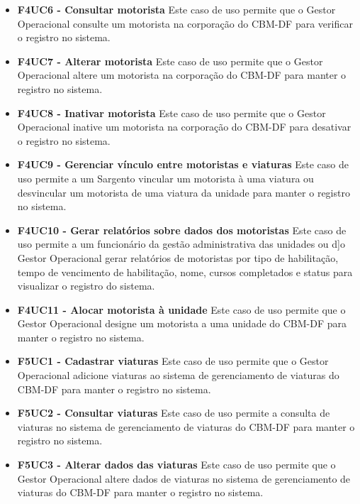 \begin{itemize}
    \item \textbf{F4UC6 - Consultar motorista}
      \subitem
      Este caso de uso permite que o Gestor Operacional consulte um motorista na corporação do CBM-DF para verificar o registro no sistema.

    \item \textbf{F4UC7 - Alterar motorista}
      \subitem
      Este caso de uso permite que o Gestor Operacional altere um motorista na corporação do CBM-DF para manter o registro no sistema.

    \item \textbf{F4UC8 - Inativar motorista}
      \subitem
      Este caso de uso permite que o Gestor Operacional inative um motorista na corporação do CBM-DF para desativar o registro no sistema.

    \item \textbf{F4UC9 - Gerenciar vínculo entre motoristas e viaturas}
      \subitem
      Este caso de uso permite a um Sargento vincular um motorista à uma viatura ou desvincular um motorista de uma viatura da unidade
      para manter o registro no sistema.

    \item \textbf{F4UC10 - Gerar relatórios sobre dados dos motoristas}
      \subitem
      Este caso de uso permite a um funcionário da gestão administrativa das unidades ou d]o Gestor Operacional gerar relatórios de 
      motoristas por tipo de habilitação, tempo de vencimento de habilitação, nome, cursos completados e status para visualizar
      o registro do sistema.

    \item \textbf{F4UC11 - Alocar motorista à unidade}
      \subitem
      Este caso de uso permite que o Gestor Operacional designe um motorista a uma unidade do CBM-DF para manter o registro no sistema.

    \item \textbf{F5UC1 - Cadastrar viaturas}
      \subitem
      Este caso de uso permite que o Gestor Operacional adicione viaturas ao sistema de gerenciamento de viaturas do CBM-DF 
      para manter o registro no sistema.

    \item \textbf{F5UC2 - Consultar viaturas}
      \subitem
      Este caso de uso permite a consulta de viaturas no sistema de gerenciamento de viaturas do CBM-DF para manter o registro no sistema.

    \item \textbf{F5UC3 - Alterar dados das viaturas}
      \subitem
      Este caso de uso permite que o Gestor Operacional altere dados de viaturas no sistema de gerenciamento de viaturas do 
      CBM-DF para manter o registro no sistema.


\end{itemize}
